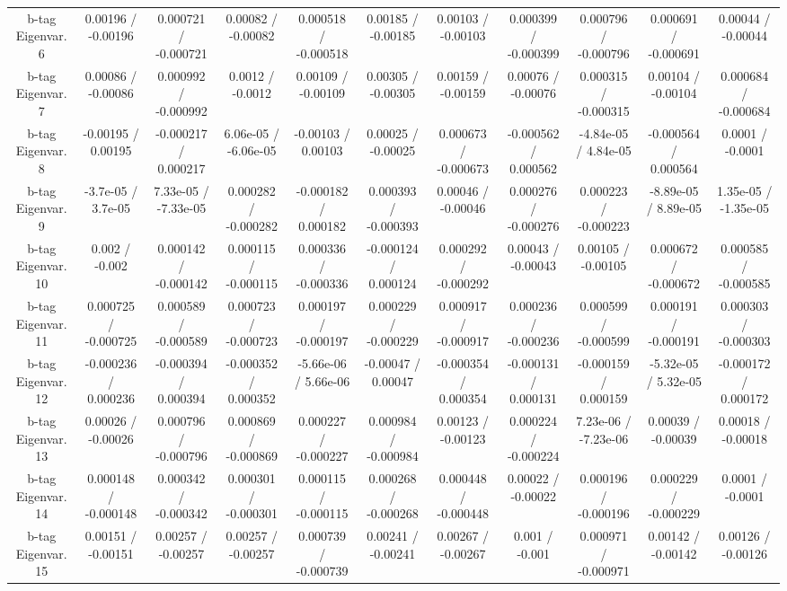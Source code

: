 \begin{table}[htbp]
\begin{center}
\begin{tabular}{|c|c|c|c|c|c|c|c|c|c|c|}
  b-tag Eigenvar. 6 & 0.00196 / -0.00196 & 0.000721 / -0.000721 & 0.00082 / -0.00082 & 0.000518 / -0.000518 & 0.00185 / -0.00185 & 0.00103 / -0.00103 & 0.000399 / -0.000399 & 0.000796 / -0.000796 & 0.000691 / -0.000691 & 0.00044 / -0.00044 \\ 
  b-tag Eigenvar. 7 & 0.00086 / -0.00086 & 0.000992 / -0.000992 & 0.0012 / -0.0012 & 0.00109 / -0.00109 & 0.00305 / -0.00305 & 0.00159 / -0.00159 & 0.00076 / -0.00076 & 0.000315 / -0.000315 & 0.00104 / -0.00104 & 0.000684 / -0.000684 \\ 
  b-tag Eigenvar. 8 & -0.00195 / 0.00195 & -0.000217 / 0.000217 & 6.06e-05 / -6.06e-05 & -0.00103 / 0.00103 & 0.00025 / -0.00025 & 0.000673 / -0.000673 & -0.000562 / 0.000562 & -4.84e-05 / 4.84e-05 & -0.000564 / 0.000564 & 0.0001 / -0.0001 \\ 
  b-tag Eigenvar. 9 & -3.7e-05 / 3.7e-05 & 7.33e-05 / -7.33e-05 & 0.000282 / -0.000282 & -0.000182 / 0.000182 & 0.000393 / -0.000393 & 0.00046 / -0.00046 & 0.000276 / -0.000276 & 0.000223 / -0.000223 & -8.89e-05 / 8.89e-05 & 1.35e-05 / -1.35e-05 \\ 
  b-tag Eigenvar. 10 & 0.002 / -0.002 & 0.000142 / -0.000142 & 0.000115 / -0.000115 & 0.000336 / -0.000336 & -0.000124 / 0.000124 & 0.000292 / -0.000292 & 0.00043 / -0.00043 & 0.00105 / -0.00105 & 0.000672 / -0.000672 & 0.000585 / -0.000585 \\ 
  b-tag Eigenvar. 11 & 0.000725 / -0.000725 & 0.000589 / -0.000589 & 0.000723 / -0.000723 & 0.000197 / -0.000197 & 0.000229 / -0.000229 & 0.000917 / -0.000917 & 0.000236 / -0.000236 & 0.000599 / -0.000599 & 0.000191 / -0.000191 & 0.000303 / -0.000303 \\ 
  b-tag Eigenvar. 12 & -0.000236 / 0.000236 & -0.000394 / 0.000394 & -0.000352 / 0.000352 & -5.66e-06 / 5.66e-06 & -0.00047 / 0.00047 & -0.000354 / 0.000354 & -0.000131 / 0.000131 & -0.000159 / 0.000159 & -5.32e-05 / 5.32e-05 & -0.000172 / 0.000172 \\ 
  b-tag Eigenvar. 13 & 0.00026 / -0.00026 & 0.000796 / -0.000796 & 0.000869 / -0.000869 & 0.000227 / -0.000227 & 0.000984 / -0.000984 & 0.00123 / -0.00123 & 0.000224 / -0.000224 & 7.23e-06 / -7.23e-06 & 0.00039 / -0.00039 & 0.00018 / -0.00018 \\ 
  b-tag Eigenvar. 14 & 0.000148 / -0.000148 & 0.000342 / -0.000342 & 0.000301 / -0.000301 & 0.000115 / -0.000115 & 0.000268 / -0.000268 & 0.000448 / -0.000448 & 0.00022 / -0.00022 & 0.000196 / -0.000196 & 0.000229 / -0.000229 & 0.0001 / -0.0001 \\ 
  b-tag Eigenvar. 15 & 0.00151 / -0.00151 & 0.00257 / -0.00257 & 0.00257 / -0.00257 & 0.000739 / -0.000739 & 0.00241 / -0.00241 & 0.00267 / -0.00267 & 0.001 / -0.001 & 0.000971 / -0.000971 & 0.00142 / -0.00142 & 0.00126 / -0.00126 \\ 

\end{tabular}
\end{center}
\end{table}
